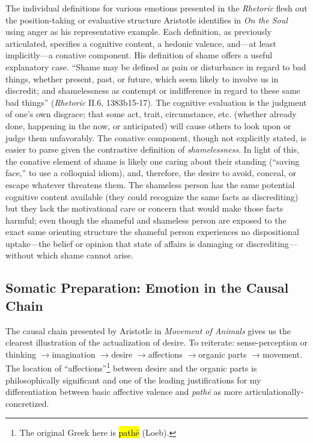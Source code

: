 \documentclass{article}
\newcommand{\ra}{\ensuremath{\rightarrow}}
\begin{document}
The individual definitions for various emotions presented in the \textit{Rhetoric} flesh out the position-taking or evaluative structure Aristotle identifies in \textit{On the Soul} using anger as his representative example. Each definition, as previously articulated, specifies a cognitive content, a hedonic valence, and---at least implicitly---a conative component. His definition of shame offers a useful explanatory case. ``Shame may be defined as pain or disturbance in regard to bad things, whether present, past, or future, which seem likely to involve us in discredit; and shamelessness as contempt or indifference in regard to these same bad things'' (\textit{Rhetoric} II.6, 1383b15-17). The cognitive evaluation is the judgment of one's own disgrace; that some act, trait, circumstance, etc. (whether already done, happening in the now, or anticipated) will cause others to look upon or judge them unfavorably. The conative component, though not explicitly stated, is easier to parse given the contrastive definition of \textit{shamelessness}. In light of this, the conative element of shame is likely one caring about their standing (``saving face,'' to use a colloquial idiom), and, therefore, the desire to avoid, conceal, or escape whatever threatens them. The shameless person has the same potential cognitive content available (they could recognize the same facts as discrediting) but they lack the motivational care or concern that would make those facts harmful; even though the shameful and shameless person are exposed to the exact same orienting structure the shameful person experiences no dispositional uptake---the belief or opinion that state of affairs is damaging or discrediting---without which shame cannot arise. 

\subsection{Somatic Preparation: Emotion in the Causal Chain}

The causal chain presented by Aristotle in \textit{Movement of Animals} gives us the clearest illustration of the actualization of desire. To reiterate: sense-perception or thinking \ra imagination \ra desire \ra affections \ra organic parts \ra movement. The location of ``affections''\footnote{The original Greek here is \hl{pathē} (Loeb).} between desire and the organic parts is philosophically significant and one of the leading justifications for my differentiation between basic affective valence and \textit{pathē} as more articulationally-concretized. 
\end{document}
